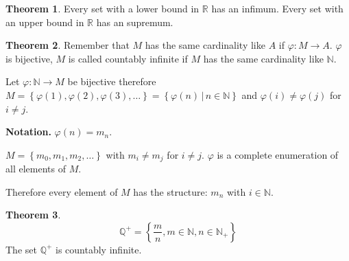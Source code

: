 \documentclass[a4paper,landscape,twocolumn]{article}
\theoremstyle{definition}
\newtheorem{theorem}{Theorem}
\newcommand\set[1]{\left\{#1\right\}}
\newcommand\setdef[2]{\left\{#1\,|\,#2\right\}}
\begin{document}
\begin{theorem}
  Every set with a lower bound in $\mathbb R$ has an infimum.
  Every set with an upper bound in $\mathbb R$ has an supremum.
\end{theorem}

\begin{theorem}
  Remember that $M$ has the same cardinality like $A$ if $\varphi: M \to A$.
  $\varphi$ is bijective, $M$ is called countably infinite
  if $M$ has the same cardinality like $\mathbb N$.

  Let $\varphi: \mathbb N \to M$ be bijective therefore
  $M = \set{\varphi(1), \varphi(2), \varphi(3), \ldots} = \setdef{\varphi(n)}{n \in \mathbb N}$
  and $\varphi(i) \neq \varphi(j)$ for $i \neq j$.

  \textbf{Notation.} $\varphi(n) = m_n$.

  $M = \set{m_0, m_1, m_2, \ldots}$ with $m_i \neq m_j$ for $i \neq j$.
  $\varphi$ is a complete enumeration of all elements of $M$.

  Therefore every element of $M$ has the structure: $m_n$ with $i \in \mathbb N$.
\end{theorem}

\begin{theorem}
  \[ \mathbb Q^+ = \set{\frac mn, m \in \mathbb N, n \in \mathbb N_+} \]
  The set $\mathbb Q^+$ is countably infinite.
\end{theorem}
\end{document}
